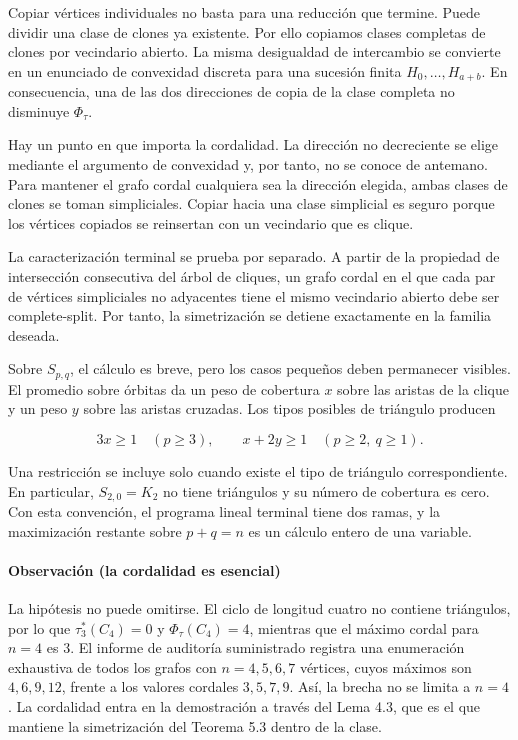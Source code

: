 \documentclass[spanish,11pt,a4paper]{article}
\begin{document}
Copiar vértices individuales no basta para una reducción que termine.
Puede dividir una clase de clones ya existente. Por ello copiamos clases
completas de clones por vecindario abierto. La misma desigualdad de
intercambio se convierte en un enunciado de convexidad discreta para una
sucesión finita \(H_0,\ldots,H_{a+b}\). En consecuencia, una de las dos
direcciones de copia de la clase completa no disminuye \(\Phi_\tau\).

Hay un punto en que importa la cordalidad. La dirección no decreciente
se elige mediante el argumento de convexidad y, por tanto, no se conoce
de antemano. Para mantener el grafo cordal cualquiera sea la dirección
elegida, ambas clases de clones se toman simpliciales. Copiar hacia una
clase simplicial es seguro porque los vértices copiados se reinsertan
con un vecindario que es clique.

La caracterización terminal se prueba por separado. A partir de la
propiedad de intersección consecutiva del árbol de cliques, un grafo
cordal en el que cada par de vértices simpliciales no adyacentes tiene
el mismo vecindario abierto debe ser complete-split. Por tanto, la
simetrización se detiene exactamente en la familia deseada.

Sobre \(S_{p,q}\), el cálculo es breve, pero los casos pequeños deben
permanecer visibles. El promedio sobre órbitas da un peso de cobertura
\(x\) sobre las aristas de la clique y un peso \(y\) sobre las aristas
cruzadas. Los tipos posibles de triángulo producen

\[
3x\ge1
\quad(p\ge3),
\qquad
x+2y\ge1
\quad(p\ge2,\ q\ge1).
\]

Una restricción se incluye solo cuando existe el tipo de triángulo
correspondiente. En particular, \(S_{2,0}=K_2\) no tiene triángulos y su
número de cobertura es cero. Con esta convención, el programa lineal
terminal tiene dos ramas, y la maximización restante sobre \(p+q=n\) es
un cálculo entero de una variable.

\paragraph{Observación (la cordalidad es
esencial)}\label{observaciuxf3n-la-cordalidad-es-esencial}

La hipótesis no puede omitirse. El ciclo de longitud cuatro no contiene
triángulos, por lo que \(\tau_3^*(C_4)=0\) y \(\Phi_\tau(C_4)=4\),
mientras que el máximo cordal para \(n=4\) es \(3\). El informe de
auditoría suministrado registra una enumeración exhaustiva de todos los
grafos con \(n=4,5,6,7\) vértices, cuyos máximos son \(4,6,9,12\),
frente a los valores cordales \(3,5,7,9\). Así, la brecha no se limita a
\(n=4\). La cordalidad entra en la demostración a través del Lema 4.3,
que es el que mantiene la simetrización del Teorema 5.3 dentro de la
clase.
\end{document}
